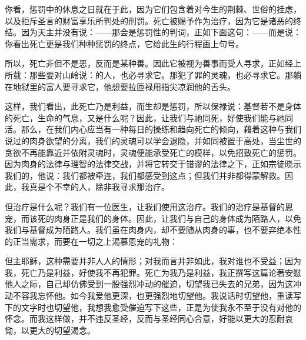 你看，惩罚中的休息之日就在于此，因为它们包含着对今生的荆棘、世俗的挂虑，以及拒斥圣言的财富享乐所判处的刑罚。死亡被赐予作为治疗，因为它是诸恶的终结。因为天主并没有说：——那会是惩罚性的判词，正如下面这句：——而是说：你看出死亡更是我们种种惩罚的终点，它给此生的行程画上句号。\par

所以，死亡非但不是恶，反而是某种善。因此它被视为善事而受人寻求，正如经上所载：那些要对山岭说：的人，也必寻求它。那犯了罪的灵魂，也必寻求它。那躺在地狱里的富人要寻求它，他想要拉匝禄用指尖凉润他的舌头。\par

这样，我们看出，此死亡乃是利益，而生却是惩罚，所以保禄说：基督若不是身体的死亡，生命的气息，又是什么呢？因此，让我们与祂同死，好使我们能与祂同活。那么，在我们内心应当有一种每日的操练和趋向死亡的倾向，藉着这种与我们说过的肉身欲望的分离，我们的灵魂可以学会退隐，并如同被置于高处，当尘世的贪欲不再能靠近并依附灵魂时，灵魂便能承受死亡的模样，以免招致死亡的惩罚。因为肉身的法律与理智的法律交战，并将它转交于错谬的法律之下，正如宗徒晓示我们的，他说：我们都被牵连，我们都感受到这点；但我们并非都得蒙解救。因此，我真是个不幸的人，除非我寻求那治疗。\par

但治疗是什么呢？我们有一位医生，让我们使用这治疗。我们的治疗是基督的恩宠，而该死的肉身正是我们的身体。因此，让我们与自己的身体成为陌路人，以免我们与基督成为陌路人。我们虽在肉身内，却不要随从肉身的事，也不要弃绝本性的正当需求，而要在一切之上渴慕恩宠的礼物：\par

但主耶稣，这种需要并非人人的情形；对我而言并非如此，我对谁也不受益；因为我，死亡乃是利益，好使我不再犯罪。死亡为我乃是利益，我正撰写这篇论著安慰他人之际，自己却仿佛受到一股强烈冲动的催迫，切望我已失去的兄弟，因为这冲动不容我忘怀他。如今我爱他更深，也更强烈地切望他。我说话时切望他，重读写下的文字时也切望他，我想我愈受催迫写下这些，正是为使我永不至于没有对他的怀念。而我这样做，并不违反圣经，反而与圣经同心合意，好能以更大的忍耐哀恸，以更大的切望渴念。\par

